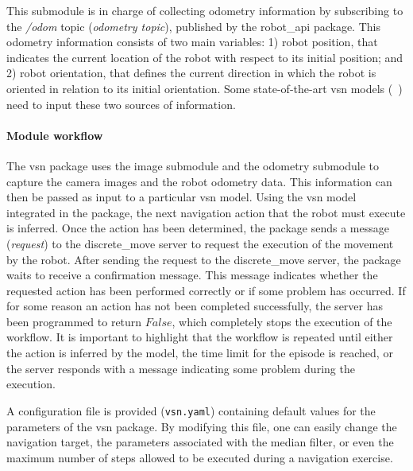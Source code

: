 This submodule is in charge of collecting odometry information by subscribing to the \textit{/odom} topic (\textit{odometry topic}), published by the robot\_api package.
This odometry information consists of two main variables: 1) robot position, that indicates the current location of the robot with respect to its initial position; and 2) robot orientation, that defines the current direction in which the robot is oriented in relation to its initial orientation.
Some state-of-the-art \acrshort{vsn} models (\eg~\cite{ramrakhya2023}) need to input these two sources of information.

\paragraph*{\textbf{Module workflow}}\label{par:module-workflow}

The \acrshort{vsn} package uses the image submodule and the odometry submodule to capture the camera images and the robot odometry data.
This information can then be passed as input to a particular \acrshort{vsn} model.
Using the \acrshort{vsn} model integrated in the package, the next navigation action that the robot must execute is inferred.
Once the action has been determined, the package sends a message (\textit{request}) to the discrete\_move server to request the execution of the movement by the robot.
After sending the request to the discrete\_move server, the package waits to receive a confirmation message.
This message indicates whether the requested action has been performed correctly or if some problem has occurred.
If for some reason an action has not been completed successfully, the server has been programmed to return $False$, which completely stops the execution of the workflow.
It is important to highlight that the workflow is repeated until either the \stopac action is inferred by the model, the time limit for the episode is reached, or the server responds with a message indicating some problem during the execution.

A configuration file is provided (\texttt{vsn.yaml}) containing default values for the parameters of the \acrshort{vsn} package.
By modifying this file, one can easily change the navigation target, the parameters associated with the median filter, or even the maximum number of steps allowed to be executed during a navigation exercise.

